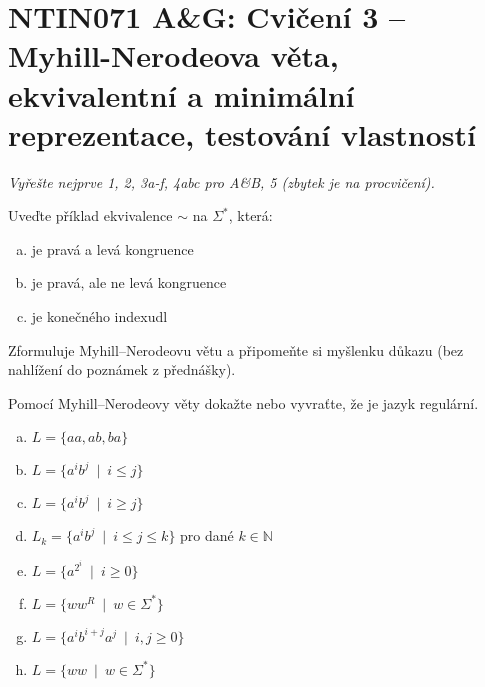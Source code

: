 \documentclass[a4paper,12pt]{amsart}
\begin{document}

\section*{NTIN071 A\&G: Cvičení 3 -- Myhill-Nerodeova věta, ekvivalentní a minimální reprezentace, testování vlastností}


\medskip

\noindent\emph{Vyřešte nejprve 1, 2, 3a-f, 4abc pro A\&B, 5 (zbytek je na procvičení).}

\medskip


\medskip\begin{problem}

    Uveďte příklad ekvivalence $\sim$ na $\Sigma^*$, která:

    \begin{enumerate}[(a)]\setlength\itemsep{6pt}
        \item je pravá a levá kongruence
        \item je pravá, ale ne levá kongruence
        \item je konečného indexudl
    \end{enumerate}

\end{problem}


\medskip\begin{problem}
    
    Zformuluje Myhill--Nerodeovu větu a připomeňte si myšlenku důkazu (bez nahlížení do poznámek z přednášky).

\end{problem}


\medskip\begin{problem}

    Pomocí Myhill--Nerodeovy věty dokažte nebo vyvraťte, že je jazyk regulární.

    \begin{multicols}{2}

        \begin{enumerate}[(a)]\setlength\itemsep{12pt}
            \item $L=\{aa, ab, ba\}$
            \item $L=\{a^ib^j\ \mid\ i\leq j\}$
            \item $L=\{a^ib^j\ \mid\ i\geq j\}$
            \item $L_k=\{a^ib^j\ \mid\ i\leq j\leq k\}$ pro dané $k\in\mathbb N$
            \item $L=\{a^{2^i}\ \mid\ i\geq 0\}$
            \item $L=\{ww^R\ \mid \ w\in\Sigma^*\}$%
            \item $L=\{a^ib^{i+j}a^j\ \mid\ i,j\geq 0\}$
            \item $L=\{ww\ \mid \ w\in\Sigma^*\}$
        \end{enumerate}
        
    \end{multicols}    

\end{problem}
\end{document}
